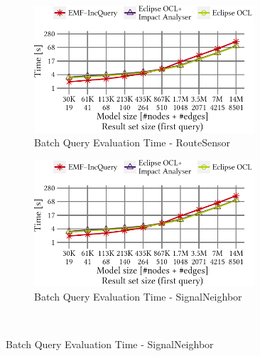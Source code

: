 \begin{figure}[ht]
\begin{center}
	\begin{subfigure}[t]{0.48\textwidth}\centering
	    \includegraphics[width=0.9\textwidth]{figures/trainBenchmark_User_BatchValid_RouteSensor}
	    \caption{Batch Query Evaluation Time - RouteSensor}
	    \label{fig:BatchValid_RouteSensor}
	\end{subfigure}
	\begin{subfigure}[t]{0.48\textwidth}\centering
	    \includegraphics[width=0.9\textwidth]{figures/trainBenchmark_User_BatchValid_RouteSensor}
	    \caption{Batch Query Evaluation Time - SignalNeighbor}
	    \label{fig:BatchValid_SignalNeighbor}
	\end{subfigure} \\


\end{center}
\end{figure}
